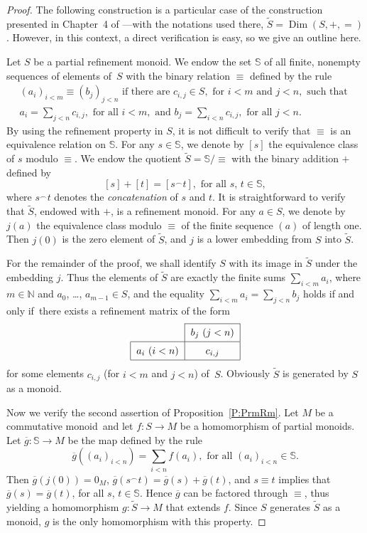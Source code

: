 \documentclass[psamsfonts,reqno]{memo-l}
\theoremstyle{plain}
\theoremstyle{definition}
\theoremstyle{remark}
\numberwithin{equation}{section}
\renewcommand{\iff}{if and only if}
\newcommand{\oll}[1]{\overline{#1}}
\newcommand{\conc}{\mathbin{{}^{\frown}}}
\newcommand{\Ref}[1]{\widetilde{#1}}
\newcommand{\tvi}{\vrule height 12pt depth 6pt width 0pt}
\newcommand{\NN}{\mathbb{N}}
\newcommand{\cm}{commutative mon\-oid}
\newcommand{\prm}{partial refinement mon\-oid}
\DeclareMathOperator{\Dim}{Dim}
\newcommand{\famm}[2]{(#1)_{#2}}
\begin{document}
\begin{proof}
The following construction is a particular case of the construction presented
in Chapter~4 of \cite{WDim}---with the notations used
there, $\Ref S=\Dim(S,+,=)$. However, in this context, a direct verification
is easy, so we give an outline here.

Let $S$ be a \prm. We endow the set $\mathbb{S}$ of all finite,
nonempty sequences of elements of~$S$ with the binary relation $\equiv$
defined by the rule
   \begin{multline*}
   \famm{a_i}{i<m}\equiv\famm{b_j}{j<n}\text{ if there are }c_{i,j}\in S,
   \text{ for }i<m\text{ and }j<n,\text{ such that }\\
   a_i=\sum_{j<n}c_{i,j},\text{ for all }i<m,\text{ and }
   b_j=\sum_{i<n}c_{i,j},\text{ for all }j<n.
   \end{multline*}
By using the refinement property in $S$, it is not difficult to verify that
$\equiv$ is an equivalence relation on $\mathbb{S}$. For any
$s\in\mathbb{S}$, we denote by $[s]$ the equivalence class of $s$ modulo
$\equiv$. We endow the quotient $\Ref S=\mathbb{S}/{\equiv}$ with the binary
addition $+$ defined by\index{stczzonc@$s\conc t$|ii}
   \[
   [s]+[t]=[s\conc t],\text{ for all }s,\,t\in\mathbb{S},
   \]
where $s\conc t$ denotes the \emph{concatenation} of $s$ and $t$. It is
straightforward to verify that $\Ref S$, endowed with $+$, is
a refinement monoid. For any $a\in S$,
we denote by $j(a)$ the equivalence class modulo
$\equiv$ of the finite sequence $(a)$ of length one. Then $j(0)$ is the zero
element of $\Ref S$, and $j$ is a lower embedding
from $S$ into $\Ref S$.

For the remainder of the proof, we shall identify $S$ with its image
in $\Ref S$ under the embedding $j$. Thus the elements of $\Ref S$ are exactly
the finite sums $\sum_{i<m}a_i$, where $m\in\NN$ and
$a_0$, \dots, $a_{m-1}\in S$, and the equality $\sum_{i<m}a_i=\sum_{j<n}b_j$
holds \iff\ there exists a refinement matrix of the form
   \[
   \begin{tabular}{|c|c|}
   \cline{2-2}
   \multicolumn{1}{l|}{} & $b_j\ (j<n)$\tvi\\
   \hline
   $a_i\ (i<n)$ & $c_{i,j}$\tvi\\
   \hline
   \end{tabular}
   \]
for some elements $c_{i,j}$ (for $i<m$ and $j<n$) of~$S$.
Obviously $\Ref S$ is generated by $S$ as a monoid.

Now we verify the second assertion of Proposition~\ref{P:PrmRm}. Let $M$ be a
\cm\ and let $f\colon S\to M$ be a homomorphism of partial monoids. Let
$\oll{g}\colon\mathbb{S}\to M$ be the map defined by the rule
   \[
   \oll{g}(\famm{a_i}{i<n})=\sum_{i<n}f(a_i),\text{ for all }
   \famm{a_i}{i<n}\in\mathbb{S}.
   \]
Then $\oll{g}(j(0))=0_M$,
$\oll{g}(s\conc t)=\oll{g}(s)+\oll{g}(t)$, and
$s\equiv t$ implies that $\oll{g}(s)=\oll{g}(t)$, for all $s$,
$t\in\mathbb{S}$. Hence $\oll{g}$ can be factored through
$\equiv$, thus yielding a homomorphism $g\colon\Ref S\to M$ that extends $f$.
Since $S$ generates $\Ref S$ as a monoid, $g$ is the only homomorphism with
this property.
\end{proof}
\end{document}
